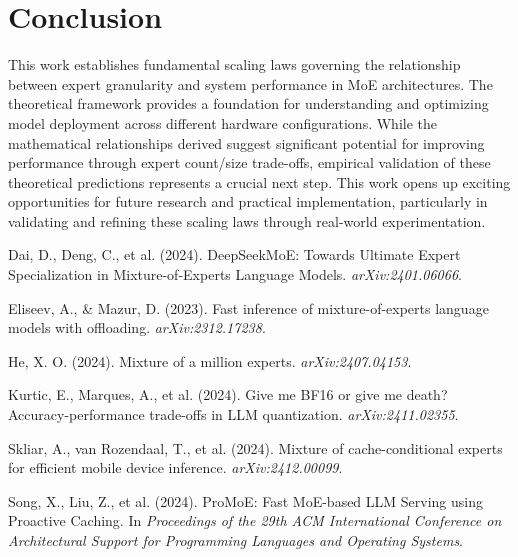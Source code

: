 \documentclass[11pt]{article}
\begin{document}
\section{Conclusion}

This work establishes fundamental scaling laws governing the relationship between expert granularity and system performance in MoE architectures. The theoretical framework provides a foundation for understanding and optimizing model deployment across different hardware configurations. While the mathematical relationships derived suggest significant potential for improving performance through expert count/size trade-offs, empirical validation of these theoretical predictions represents a crucial next step. This work opens up exciting opportunities for future research and practical implementation, particularly in validating and refining these scaling laws through real-world experimentation.

\begin{thebibliography}{9}

Dai, D., Deng, C., et al. (2024).
\newblock DeepSeekMoE: Towards Ultimate Expert Specialization in Mixture-of-Experts Language Models.
\newblock \emph{arXiv:2401.06066}.

Eliseev, A., \& Mazur, D. (2023).
\newblock Fast inference of mixture-of-experts language models with offloading.
\newblock \emph{arXiv:2312.17238}.

He, X. O. (2024).
\newblock Mixture of a million experts.
\newblock \emph{arXiv:2407.04153}.

Kurtic, E., Marques, A., et al. (2024).
\newblock Give me BF16 or give me death? Accuracy-performance trade-offs in LLM quantization.
\newblock \emph{arXiv:2411.02355}.

Skliar, A., van Rozendaal, T., et al. (2024).
\newblock Mixture of cache-conditional experts for efficient mobile device inference.
\newblock \emph{arXiv:2412.00099}.

Song, X., Liu, Z., et al. (2024).
\newblock ProMoE: Fast MoE-based LLM Serving using Proactive Caching.
\newblock In \emph{Proceedings of the 29th ACM International Conference on Architectural Support for Programming Languages and Operating Systems}.

\end{thebibliography}
\end{document}
